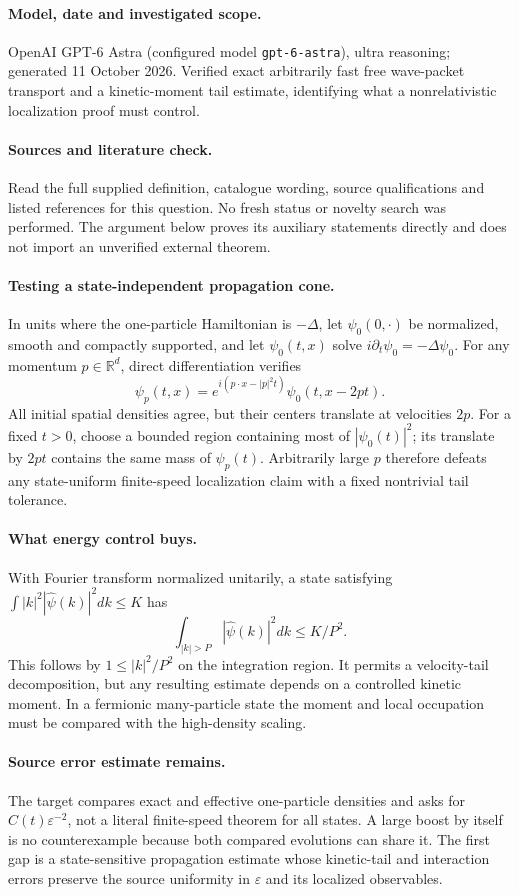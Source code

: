 \documentclass[11pt]{article}
\begin{document}
\paragraph{Model, date and investigated scope.}
OpenAI GPT-6 Astra (configured model \texttt{gpt-6-astra}), ultra reasoning; generated 11 October 2026. Verified exact arbitrarily fast free wave-packet transport and a kinetic-moment tail estimate, identifying what a nonrelativistic localization proof must control.

\paragraph{Sources and literature check.}
Read the full supplied definition, catalogue wording, source qualifications and listed references for this question. No fresh status or novelty search was performed. The argument below proves its auxiliary statements directly and does not import an unverified external theorem.

\paragraph{Testing a state-independent propagation cone.} In units where the one-particle Hamiltonian is \(-\Delta\), let \(\psi_0(0,\cdot)\) be normalized, smooth and compactly supported, and let \(\psi_0(t,x)\) solve \(i\partial_t\psi_0=-\Delta\psi_0\). For any momentum \(p\in\mathbb R^d\), direct differentiation verifies
\[
 \psi_p(t,x)=e^{i(p\cdot x-|p|^2t)}\psi_0(t,x-2pt).
\]
All initial spatial densities agree, but their centers translate at velocities \(2p\). For a fixed \(t>0\), choose a bounded region containing most of \(|\psi_0(t)|^2\); its translate by \(2pt\) contains the same mass of \(\psi_p(t)\). Arbitrarily large \(p\) therefore defeats any state-uniform finite-speed localization claim with a fixed nontrivial tail tolerance.
\paragraph{What energy control buys.} With Fourier transform normalized unitarily, a state satisfying \(\int |k|^2|\widehat\psi(k)|^2dk\leq K\) has
\[
 \int_{|k|>P}|\widehat\psi(k)|^2dk\leq K/P^2.
\]
This follows by \(1\leq |k|^2/P^2\) on the integration region. It permits a velocity-tail decomposition, but any resulting estimate depends on a controlled kinetic moment. In a fermionic many-particle state the moment and local occupation must be compared with the high-density scaling.
\paragraph{Source error estimate remains.} The target compares exact and effective one-particle densities and asks for \(C(t)\varepsilon^{-2}\), not a literal finite-speed theorem for all states. A large boost by itself is no counterexample because both compared evolutions can share it. The first gap is a state-sensitive propagation estimate whose kinetic-tail and interaction errors preserve the source uniformity in \(\varepsilon\) and its localized observables.
\end{document}
